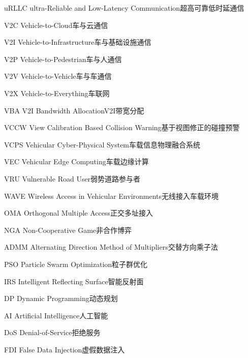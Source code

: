 \begin{abbreviate}[0mm][18mm]
\item[uRLLC] ultra-Reliable and Low-Latency Communication\hspace{1em}超高可靠低时延通信
\item[V2C] Vehicle-to-Cloud\hspace{1em}车与云通信
\item[V2I] Vehicle-to-Infrastructure\hspace{1em}车与基础设施通信
\item[V2P] Vehicle-to-Pedestrian\hspace{1em}车与人通信
\item[V2V] Vehicle-to-Vehicle\hspace{1em}车与车通信
\item[V2X] Vehicle-to-Everything\hspace{1em}车联网
\item[VBA] V2I Bandwidth Allocation\hspace{1em}V2I带宽分配
\item[VCCW] View Calibration Based Collision Warning\hspace{1em}基于视图修正的碰撞预警
\item[VCPS] Vehicular Cyber-Physical System\hspace{1em}车载信息物理融合系统
\item[VEC] Vehicular Edge Computing\hspace{1em}车载边缘计算
\item[VRU] Vulnerable Road User\hspace{1em}弱势道路参与者
\item[WAVE] Wireless Access in Vehicular Environments\hspace{1em}无线接入车载环境
\item[OMA] Orthogonal Multiple Access\hspace{1em}正交多址接入
\item[NGA] Non-Cooperative Game\hspace{1em}非合作博弈
\item[ADMM] Alternating Direction Method of Multipliers\hspace{1em}交替方向乘子法
\item[PSO] Particle Swarm Optimization\hspace{1em}粒子群优化
\item[IRS] Intelligent Reflecting Surface\hspace{1em}智能反射面
\item[DP] Dynamic Programming\hspace{1em}动态规划
\item[AI] Artificial Intelligence\hspace{1em}人工智能
\item[DoS] Denial-of-Service\hspace{1em}拒绝服务
\item[FDI] False Data Injection\hspace{1em}虚假数据注入
\end{abbreviate}
\endinput